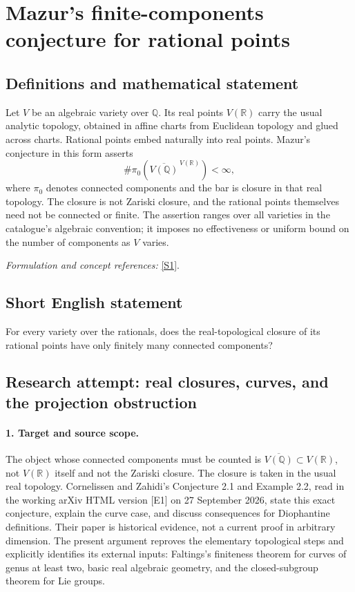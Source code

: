 \documentclass[11pt]{article}
\begin{document}
\section*{\texorpdfstring{Mazur's finite-components conjecture for rational points}{Mazur's finite-components conjecture for rational points}}\label{statement}
\subsection{Definitions and mathematical statement}
Let $V$ be an algebraic variety over ${\mathbb{Q}}$. Its real points $V({\mathbb{R}})$ carry the usual analytic topology, obtained in affine charts from Euclidean topology and glued across charts. Rational points embed naturally into real points. Mazur's conjecture in this form asserts
\[
 \#\pi_0\!\left(\overline{V({\mathbb{Q}})}^{\,V({\mathbb{R}})}\right)<\infty,
\]
where $\pi_0$ denotes connected components and the bar is closure in that real topology. The closure is not Zariski closure, and the rational points themselves need not be connected or finite. The assertion ranges over all varieties in the catalogue's algebraic convention; it imposes no effectiveness or uniform bound on the number of components as $V$ varies.
\par\smallskip\textit{Formulation and concept references:} \href{https://ar5iv.labs.arxiv.org/html/math/0006140}{[S1]}.

\subsection{Short English statement}
For every variety over the rationals, does the real-topological closure of its rational points have only finitely many connected components?
\subsection{Research attempt: real closures, curves, and the projection obstruction}
\paragraph{1. Target and source scope.}
The object whose connected components must be counted is $\overline{V(\mathbb Q)}\subset V(\mathbb R)$, not $V(\mathbb R)$ itself and not the Zariski closure. The closure is taken in the usual real topology. Cornelissen and Zahidi's Conjecture 2.1 and Example 2.2, read in the working arXiv HTML version [E1] on 27 September 2026, state this exact conjecture, explain the curve case, and discuss consequences for Diophantine definitions. Their paper is historical evidence, not a current proof in arbitrary dimension. The present argument reproves the elementary topological steps and explicitly identifies its external inputs: Faltings's finiteness theorem for curves of genus at least two, basic real algebraic geometry, and the closed-subgroup theorem for Lie groups.
\end{document}
